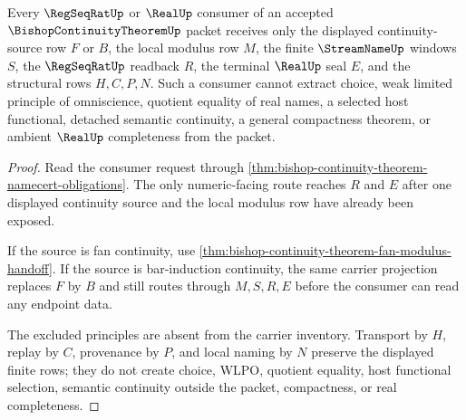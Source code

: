 \begin{theorem}
\label{thm:bishop-continuity-theorem-nonescape-boundary}
Every $\RegSeqRatUp$ or $\RealUp$ consumer of an accepted $\BishopContinuityTheoremUp$ packet receives only the displayed continuity-source row $F$ or $B$, the local modulus row $M$, the finite $\StreamNameUp$ windows $S$, the $\RegSeqRatUp$ readback $R$, the terminal $\RealUp$ seal $E$, and the structural rows $H,C,P,N$. Such a consumer cannot extract choice, weak limited principle of omniscience, quotient equality of real names, a selected host functional, detached semantic continuity, a general compactness theorem, or ambient $\RealUp$ completeness from the packet.
\end{theorem}
\begin{proof}
Read the consumer request through \autoref{thm:bishop-continuity-theorem-namecert-obligations}. The only numeric-facing route reaches $R$ and $E$ after one displayed continuity source and the local modulus row have already been exposed.

If the source is fan continuity, use \autoref{thm:bishop-continuity-theorem-fan-modulus-handoff}. If the source is bar-induction continuity, the same carrier projection replaces $F$ by $B$ and still routes through $M,S,R,E$ before the consumer can read any endpoint data.

The excluded principles are absent from the carrier inventory. Transport by $H$, replay by $C$, provenance by $P$, and local naming by $N$ preserve the displayed finite rows; they do not create choice, WLPO, quotient equality, host functional selection, semantic continuity outside the packet, compactness, or real completeness.
\end{proof}



